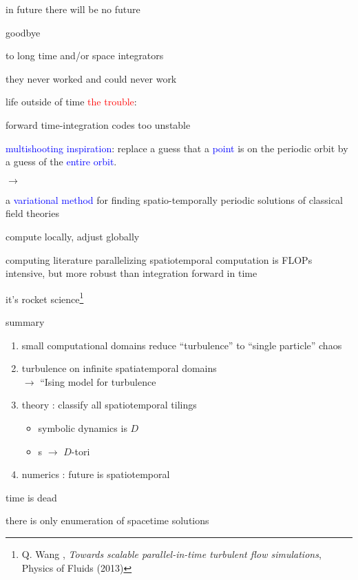 \begin{frame}{in future there will be no future}
\begin{center}
{\huge goodbye}
\end{center}

\vfill

to long time and/or space integrators

\medskip

\hfill they never worked and could never work
\end{frame}

\begin{frame}{life outside of time}
\textcolor{red}{the trouble}:

forward time-integration codes too unstable

\bigskip
\bigskip

\textcolor{blue}{multishooting inspiration}:
 replace a guess that a  \textcolor{blue}{point} is on the periodic
orbit by a guess of the \textcolor{blue}{entire orbit}.

\bigskip

$\to$

\bigskip

a \textcolor{blue}{variational method} for finding
spatio-temporally periodic solutions of classical field theories
\end{frame}

\begin{frame}{compute locally, adjust globally}

\begin{block}{computing literature}
parallelizing {\color{red}spatiotemporal}
computation is FLOPs intensive, but more robust than
integration forward in time
\end{block}

\vfill\hfill
it's rocket science\footnote{{\tiny Q. Wang \etal,}
 {\tiny\em Towards scalable parallel-in-time turbulent flow simulations},
{\tiny Physics of Fluids (2013)}}
\end{frame}


\begin{frame}{summary}
\begin{enumerate}
              \item
small computational domains reduce ``turbulence'' to ``single particle'' chaos
              \item
turbulence on infinite spatiatemporal domains \\ $\to$ ``Ising model for turbulence
              \item
theory : classify all spatiotemporal tilings
    \begin{itemize}
      \item symbolic dynamics is $D$\dmn
      \item \po s $\to$ $D$-tori
    \end{itemize}
              \item
numerics : future is spatiotemporal
\end{enumerate}

\vfill
time is {\huge dead}

\medskip
there is only enumeration of spacetime solutions
\end{frame}

